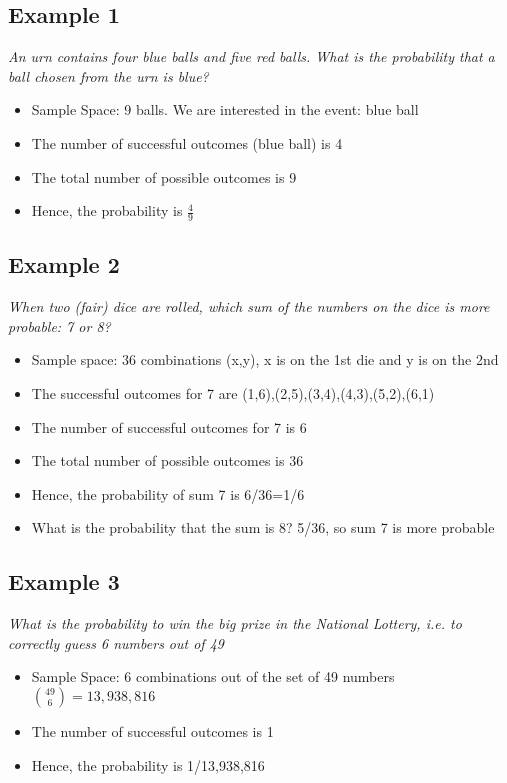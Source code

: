 \documentclass{article}[18pt]
\begin{document}
\subsection{Example 1}
\textit{An urn contains four blue balls and five red balls. What is the probability that a ball chosen from the urn is blue?}
\begin{itemize}
	\item Sample Space: 9 balls. We are interested in the event: blue ball
	\item The number of successful outcomes (blue ball) is 4
	\item The total number of possible outcomes is 9
	\item Hence, the probability is $\frac{4}{9}$
\end{itemize}
\subsection{Example 2}
\textit{When two (fair) dice are rolled, which sum of the numbers on the dice is more probable: 7 or 8?}
\begin{itemize}
	\item Sample space: 36 combinations (x,y), x is on the 1st die and y is on the 2nd
	\item The successful outcomes for 7 are (1,6),(2,5),(3,4),(4,3),(5,2),(6,1)
	\item The number of successful outcomes for 7 is 6
	\item The total number of possible outcomes is 36
	\item Hence, the probability of sum 7 is 6/36=1/6
	\item What is the probability that the sum is 8? 5/36, so sum 7 is more probable
\end{itemize}
\subsection{Example 3}
\textit{What is the probability to win the big prize in the National Lottery, i.e. to correctly guess 6 numbers out of 49}
\begin{itemize}
	\item Sample Space: 6 combinations out of the set of 49 numbers $\binom{49}{6}=13,938,816$
	\item The number of successful outcomes is 1
	\item Hence, the probability is 1/13,938,816
\end{itemize}
\end{document}
